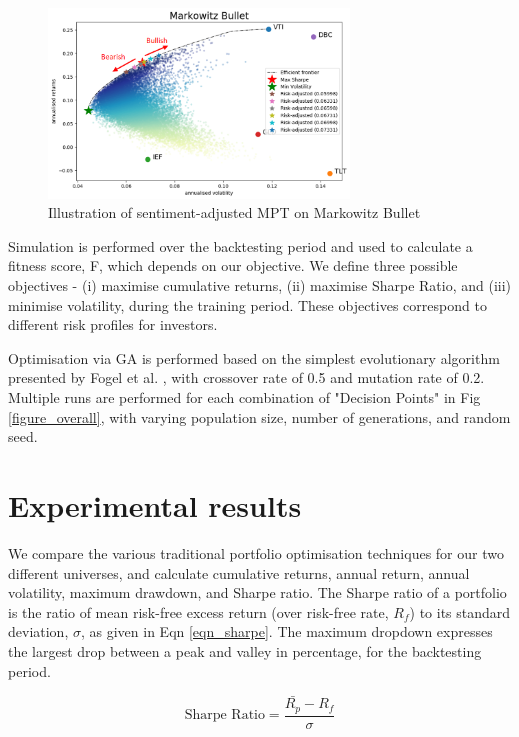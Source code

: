 \documentclass{article}
\begin{document}
\begin{figure}[tbh]
    \includegraphics[width=8cm]{figure_smpt_markowitz.png}
    \caption{Illustration of sentiment-adjusted MPT on Markowitz Bullet \label{figure_smpt_markowitz}}
\end{figure}

Simulation is performed over the backtesting period and used to calculate a fitness score, F, which depends on our objective. We define three possible objectives - (i) maximise cumulative returns, (ii) maximise Sharpe Ratio, and (iii) minimise volatility, during the training period. These objectives correspond to different risk profiles for investors.

Optimisation via GA is performed based on the simplest evolutionary algorithm presented by Fogel et al. \cite{back2018evolutionary}, with crossover rate of 0.5 and mutation rate of 0.2. Multiple runs are performed for each combination of "Decision Points" in Fig \ref{figure_overall}, with varying population size, number of generations, and random seed.


\section{Experimental results}
\label{sec:experimental results}

We compare the various traditional portfolio optimisation techniques for our two different universes, and calculate cumulative returns, annual return, annual volatility, maximum drawdown, and Sharpe ratio. The Sharpe ratio of a portfolio is the ratio of mean risk-free excess return (over risk-free rate, $R_f$) to its standard deviation, $\sigma$, as given in Eqn \ref{eqn_sharpe}. The maximum dropdown expresses the largest drop between a peak and valley in percentage, for the backtesting period.

\begin{equation}
\text{Sharpe Ratio} = \frac{\bar{R_p}-R_f}{\sigma} \label{eqn_sharpe}
\end{equation}
\end{document}
